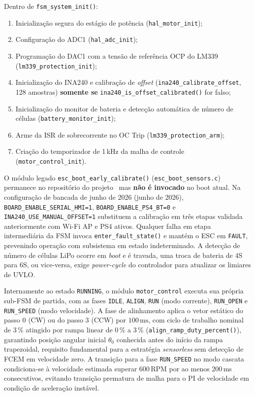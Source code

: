 Dentro de \texttt{fsm\_system\_init()}:

\begin{enumerate}
    \item Inicialização segura do estágio de potência (\texttt{hal\_motor\_init});
    \item Configuração do ADC1 (\texttt{hal\_adc\_init});
    \item Programação do DAC1 com a tensão de referência OCP do LM339 (\texttt{lm339\_protection\_init});
    \item Inicialização do INA240 e calibração de \textit{offset} (\texttt{ina240\_calibrate\_offset}, 128 amostras) \textbf{somente se} \texttt{ina240\_is\_offset\_calibrated()} for falso;
    \item Inicialização do monitor de bateria e detecção automática de número de células (\texttt{battery\_monitor\_init});
    \item Arme da ISR de sobrecorrente no OC Trip (\texttt{lm339\_protection\_arm});
    \item Criação do temporizador de 1\,kHz da malha de controle (\texttt{motor\_control\_init}).
\end{enumerate}

O módulo legado \texttt{esc\_boot\_early\_calibrate()} (\texttt{esc\_boot\_sensors.c}) permanece no repositório do projeto~\cite{esp32BldcEscRepo} mas \textbf{não é invocado} no boot atual. Na configuração de bancada de junho de 2026 (junho de 2026), \texttt{BOARD\_ENABLE\_SERIAL\_HMI=1}, \texttt{BOARD\_ENABLE\_PS4\_BT=0} e \texttt{INA240\_USE\_MANUAL\_OFFSET=1} substituem a calibração em três etapas validada anteriormente com Wi-Fi AP e PS4 ativos. Qualquer falha em etapa intermediária da FSM invoca \texttt{enter\_fault\_state()} e mantém o ESC em \texttt{FAULT}, prevenindo operação com subsistema em estado indeterminado. A detecção de número de células LiPo ocorre em \textit{boot} e é travada, uma troca de bateria de 4S para 6S, ou vice-versa, exige \textit{power-cycle} do controlador para atualizar os limiares de UVLO.

Internamente ao estado \texttt{RUNNING}, o módulo \texttt{motor\_control} executa sua própria sub-FSM de partida, com as fases \texttt{IDLE}, \texttt{ALIGN}, \texttt{RUN} (modo corrente), \texttt{RUN\_OPEN} e \texttt{RUN\_SPEED} (modo velocidade). A fase de alinhamento aplica o vetor estático do passo 0 (CW) ou do passo 3 (CCW) por $100\,\text{ms}$, com ciclo de trabalho nominal de $3\,\%$ atingido por rampa linear de $0\,\%$ a $3\,\%$ (\texttt{align\_ramp\_duty\_percent()}), garantindo posição angular inicial $\theta_0$ conhecida antes do início da rampa trapezoidal, requisito fundamental para a estratégia \textit{sensorless} sem detecção de FCEM em velocidade zero. A transição para a fase \texttt{RUN\_SPEED} no modo cascata condiciona-se à velocidade estimada superar 600\,RPM por ao menos 200\,ms consecutivos, evitando transição prematura de malha para o PI de velocidade em condição de aceleração instável.

